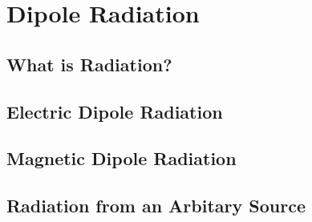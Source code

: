 \chapter{Dipole Radiation}
\section{What is Radiation?}
\section{Electric Dipole Radiation}
\section{Magnetic Dipole Radiation}
\section{Radiation from an Arbitary Source}
